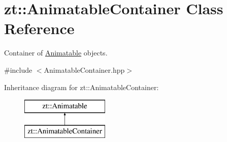 \hypertarget{classzt_1_1_animatable_container}{}\section{zt\+:\+:Animatable\+Container Class Reference}
\label{classzt_1_1_animatable_container}


Container of \hyperlink{classzt_1_1_animatable}{Animatable} objects.  




{\ttfamily \#include $<$Animatable\+Container.\+hpp$>$}

Inheritance diagram for zt\+:\+:Animatable\+Container\+:\begin{figure}[H]
\begin{center}
\leavevmode
\includegraphics[height=2.000000cm]{classzt_1_1_animatable_container}
\end{center}
\end{figure}
